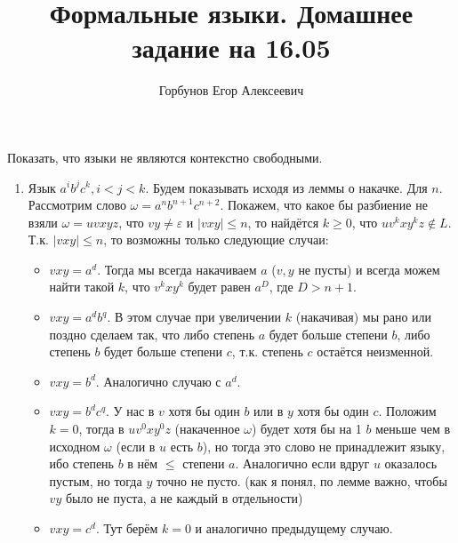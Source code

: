 


\title{Формальные языки. Домашнее задание на 16.05}
\author{Горбунов Егор Алексеевич}


\maketitle

\begin{task}[1]
	Показать, что языки не являются контекстно свободными.
\end{task}
\begin{solution}
\begin{enumerate}
	\item Язык $a^ib^jc^k, i < j < k$. Будем показывать исходя из леммы о накачке. Для $n$. Рассмотрим слово $\omega = a^{n}b^{n+1}c^{n+2}$. Покажем, что какое бы разбиение не взяли $\omega = uvxyz$, что $vy \neq \varepsilon$ и $|vxy| \leq n$, то найдётся $k \geq 0$, что $uv^kxy^kz \notin L$. Т.к. $|vxy| \leq n$, то возможны только следующие случаи:
	\begin{itemize}
		\item $vxy = a^d$. Тогда мы всегда накачиваем $a$ ($v, y$ не пусты) и всегда можем найти такой $k$, что $v^kxy^k$ будет равен $a^D$, где $D > n + 1$.
		\item $vxy = a^db^q$. В этом случае при увеличении $k$ (накачивая) мы рано или поздно сделаем так, что либо степень $a$ будет больше степени $b$, либо степень $b$ будет больше степени $c$, т.к. степень $c$ остаётся неизменной.
		\item $vxy = b^d$. Аналогично случаю с $a^d$.
		\item $vxy = b^dc^q$. У нас в $v$ хотя бы один $b$ или в $y$ хотя бы один $c$. Положим $k = 0$, тогда в $uv^0xy^0z$ (накаченное $\omega$) будет хотя бы на 1 $b$ меньше чем в исходном $\omega$ (если в $u$ есть $b$), но тогда это слово не принадлежит языку, ибо степень $b$ в нём $\leq$ степени $a$. Аналогично если вдруг $u$ оказалось пустым, но тогда $y$ точно не пусто. (как я понял, по лемме важно, чтобы $vy$ было не пуста, а не каждый в отдельности)
		\item $vxy = c^d$. Тут берём $k = 0$ и аналогично предыдущему случаю.
	\end{itemize}
	\xqed


\end{enumerate}
\end{solution}
